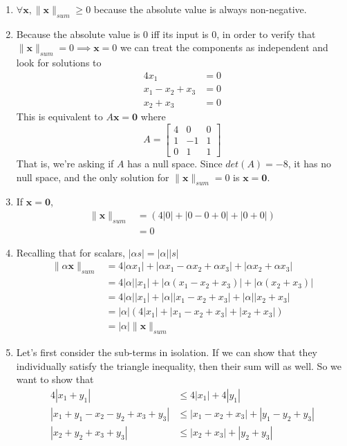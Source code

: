 \documentclass[]{article}
\newcommand{\bbm}{\begin{bmatrix}}
\newcommand{\ebm}{\end{bmatrix}}
\newcommand\nsum[1]{\| #1 \|_{sum}}
\begin{document}
\begin{enumerate}[resume]
\begin{enumerate}
	\begin{enumerate}
    \item $\forall \bm{x}, \nsum{\bm{x}} \geq 0$ because the
      absolute value is always non-negative.
    \item Because the absolute value is 0 iff its input is 0, in
      order to verify that $\nsum{\bm{x}} = 0 \implies \bm{x} =
      0$ we can treat the components as independent and look for
      solutions to
      \[ \begin{split}
        4 x_1 &= 0 \\
        x_1 - x_2 + x_3 &= 0 \\
        x_2 + x_3 &= 0
      \end{split} \]
      This is equivalent to $A \bm{x} = \bm{0}$ where
      \[
      A = \bbm
      4 & 0 & 0 \\
      1 & -1 & 1 \\
      0 & 1 & 1
      \ebm
      \]
      That is, we're asking if $A$ has a null space. Since
      $det(A) = -8$, it has no null space, and the only solution
      for $\nsum{\bm{x}} = 0$ is $\bm{x} = \bm{0}$.
      
    \item If $\bm{x} = \bm{0}$,
      \[
      \begin{split}
        \nsum{\bm{x}} &= (4|0| + |0 - 0 + 0| + |0 + 0|) \\
        &= 0
      \end{split}
      \]

    \item Recalling that for scalars, $|\alpha s| = |\alpha| |s|$
      \[ \begin{split}
        \nsum{\alpha \bm{x}} &= 4|\alpha x_1| + |\alpha x_1 - \alpha x_2 + \alpha x_3| + |\alpha x_2 + \alpha x_3| \\
        &= 4|\alpha||x_1| + |\alpha (x_1 - x_2 + x_3)| + |\alpha (x_2 + x_3)| \\
        &= 4|\alpha||x_1| + |\alpha| |x_1 - x_2 + x_3| + |\alpha| |x_2 + x_3| \\
        &= |\alpha| (4|x_1| + |x_1 - x_2 + x_3| + |x_2 + x_3|) \\
        &= |\alpha| \nsum{\bm{x}}
      \end{split} \]

    \item
      Let's first consider the sub-terms in isolation. If we can show that they individually satisfy the triangle inequality, then their sum will as well. So we want to show that
      \begin{align}
        4|x_1 + y_1| & \leq 4|x_1| + 4|y_1| \label{sub1} \\
        |x_1 + y_1 - x_2 - y_2 + x_3 + y_3| & \leq |x_1 - x_2 + x_3| + |y_1 - y_2 + y_3| \label{sub2} \\
        |x_2 + y_2 + x_3 + y_3| & \leq |x_2 + x_3| + |y_2 + y_3| \label{sub3} 
      \end{align}


\end{enumerate}
\end{enumerate}
\end{enumerate}
\end{document}
